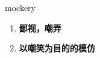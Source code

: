 
\begin{frame}
{\huge mockery}
\begin{center}
\begin{enumerate}\Large
  \item \textbf{鄙视，嘲弄}
  \item \textbf{以嘲笑为目的的模仿}
\end{enumerate}
\end{center}
\end{frame}
